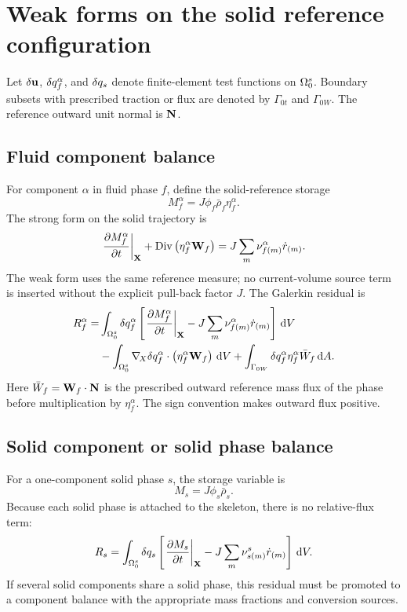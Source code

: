 \section{Weak forms on the solid reference configuration}
\label{sec:reference_solid_weak_forms}

Let \(\delta \mathbf{u}\), \(\delta q_f^\alpha\), and \(\delta q_s\) denote
finite-element test functions on \(\Omega_0^s\).  Boundary subsets with
prescribed traction or flux are denoted by \(\Gamma_{0t}\) and
\(\Gamma_{0W}\).  The reference outward unit normal is \(\mathbf{N}\).

\subsection{Fluid component balance}
\label{sec:fluid_component_weak_form}

For component \(\alpha\) in fluid phase \(f\), define the solid-reference
storage
\[
	M_f^\alpha = J\phi_f\bar\rho_f\eta_f^\alpha .
\]
The strong form on the solid trajectory is
\[
	\left.\frac{\partial M_f^\alpha}{\partial t}\right|_{\mathbf{X}}
	+\operatorname{Div}\left(\eta_f^\alpha\mathbf{W}_f\right)
	=
	J\sum_m \nu_{f(m)}^\alpha \dot r_{(m)} .
\]
The weak form uses the same reference measure; no current-volume source term is
inserted without the explicit pull-back factor \(J\).
The Galerkin residual is
\begin{align}
	R_f^\alpha
	=&
	\int_{\Omega_0^s}
	\delta q_f^\alpha
	\left[
		\left.\frac{\partial M_f^\alpha}{\partial t}\right|_{\mathbf{X}}
		-
		J\sum_m \nu_{f(m)}^\alpha \dot r_{(m)}
	\right]\,\mathrm{d} V
	\nonumber \\
	&-
	\int_{\Omega_0^s}
	\nabla_{\!X} \delta q_f^\alpha \cdot
	\left(\eta_f^\alpha\mathbf{W}_f\right)\,\mathrm{d} V
	+
	\int_{\Gamma_{0W}}
	\delta q_f^\alpha
	\eta_f^\alpha\bar W_f
	\,\mathrm{d} A .
	\label{eq:fluid_component_residual}
\end{align}
Here \(\bar W_f=\mathbf{W}_f\cdot\mathbf{N}\) is the prescribed outward reference mass
flux of the phase before multiplication by \(\eta_f^\alpha\).  The sign
convention makes outward flux positive.

\subsection{Solid component or solid phase balance}
\label{sec:solid_component_weak_form}

For a one-component solid phase \(s\), the storage variable is
\[
	M_s = J\phi_s\bar\rho_s .
\]
Because each solid phase is attached to the skeleton, there is no relative-flux
term:
\begin{equation}
	R_s =
	\int_{\Omega_0^s}
	\delta q_s
	\left[
		\left.\frac{\partial M_s}{\partial t}\right|_{\mathbf{X}}
		-
		J\sum_m \nu_{s(m)}^s \dot r_{(m)}
	\right]\,\mathrm{d} V .
	\label{eq:solid_component_residual}
\end{equation}
If several solid components share a solid phase, this residual must be promoted
to a component balance with the appropriate mass fractions and conversion
sources.

